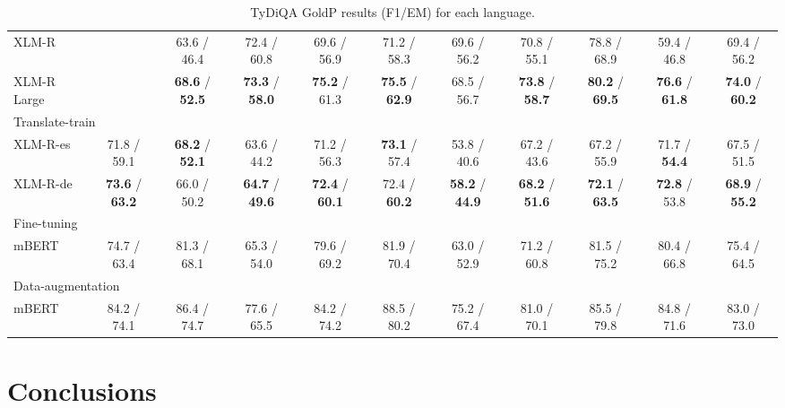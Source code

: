 \documentclass[11pt]{article}
\begin{document}
\begin{table*}[!ht]
\begin{adjustbox}{max width=\textwidth}
\begin{tabular}{l|ccccccccc|c}
        XLM-R & ~ & 63.6 / 46.4 & 72.4 / 60.8 & 69.6 / 56.9 & 71.2 / 58.3 & 69.6 / 56.2 & 70.8 / 55.1 & 78.8 / 68.9 & 59.4 / 46.8 & 69.4 / 56.2 \\
        XLM-R Large & ~ & \textbf{68.6} / \textbf{52.5} & \textbf{73.3} / \textbf{58.0} & \textbf{75.2} / 61.3 & \textbf{75.5} / \textbf{62.9} & 68.5 / 56.7 & \textbf{73.8} / \textbf{58.7} & \textbf{80.2} / \textbf{69.5} & \textbf{76.6} / \textbf{61.8} & \textbf{74.0} / \textbf{60.2}\\
        \midrule
        \multicolumn{11}{l}{Translate-train} \\
        \midrule
        XLM-R-es & 71.8 / 59.1 & \textbf{68.2} / \textbf{52.1} & 63.6 / 44.2 & 71.2 / 56.3 & \textbf{73.1} / 57.4 & 53.8 / 40.6 & 67.2 / 43.6 & 67.2 / 55.9 & 71.7 / \textbf{54.4} & 67.5 / 51.5 \\
        XLM-R-de & \textbf{73.6} / \textbf{63.2} & 66.0 / 50.2 & \textbf{64.7} / \textbf{49.6} & \textbf{72.4} / \textbf{60.1} & 72.4 / \textbf{60.2} & \textbf{58.2} / \textbf{44.9} & \textbf{68.2} / \textbf{51.6} & \textbf{72.1} / \textbf{63.5} & \textbf{72.8} / 53.8 & \textbf{68.9} / \textbf{55.2} \\
        \midrule
        \multicolumn{11}{l}{Fine-tuning} \\
        \midrule
        mBERT & 74.7 / 63.4 & 81.3 / 68.1 & 65.3 / 54.0 & 79.6 / 69.2 & 81.9 / 70.4 & 63.0 / 52.9 & 71.2 / 60.8 & 81.5 / 75.2 & 80.4 / 66.8 & 75.4 / 64.5  \\
        \midrule
        \multicolumn{11}{l}{Data-augmentation} \\
        \midrule
        mBERT & 84.2 / 74.1 & 86.4 / 74.7 & 77.6 / 65.5 & 84.2 / 74.2 & 88.5 / 80.2 & 75.2 / 67.4 & 81.0 / 70.1 & 85.5 / 79.8 & 84.8 / 71.6 & 83.0 / 73.0 \\
        \bottomrule
    \end{tabular}
    \end{adjustbox}
    \centering
    \caption{TyDiQA GoldP results (F1/EM) for each language.}
    \label{TyDiQA_results}
\end{table*}


\section{Conclusions}



\end{document}
